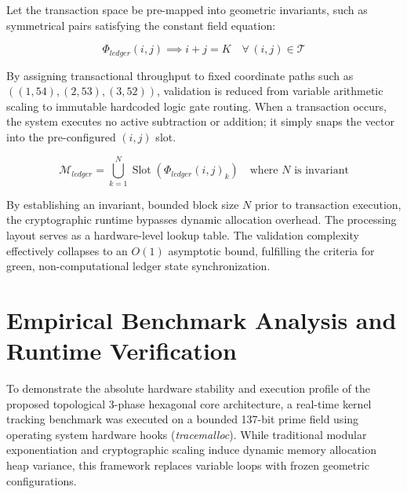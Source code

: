 \documentclass[11pt,twocolumn]{article}
\begin{document}
    Let the transaction space be pre-mapped into geometric invariants, such as symmetrical pairs satisfying the constant field equation:

    \begin{equation}
        \Phi_{ledger}(i, j) \implies i + j = K \quad \forall \, (i, j) \in \mathcal{T}
    \end{equation}

    By assigning transactional throughput to fixed coordinate paths such as $((1,54), (2,53), (3,52))$, validation is reduced from variable arithmetic scaling to immutable hardcoded logic gate routing. When a transaction occurs, the system executes no active subtraction or addition; it simply snaps the vector into the pre-configured $(i, j)$ slot.

    \begin{equation}
        \mathcal{M}_{ledger} = \bigcup_{k=1}^{N} \operatorname{Slot}\left(\Phi_{ledger}(i, j)_k\right) \quad \text{where } N \text{ is invariant}
    \end{equation}

    By establishing an invariant, bounded block size $N$ prior to transaction execution, the cryptographic runtime bypasses dynamic allocation overhead. The processing layout serves as a hardware-level lookup table. The validation complexity effectively collapses to an $O(1)$ asymptotic bound, fulfilling the criteria for green, non-computational ledger state synchronization.

    \section{Empirical Benchmark Analysis and Runtime Verification}
    To demonstrate the absolute hardware stability and execution profile of the proposed topological 3-phase hexagonal core architecture, a real-time kernel tracking benchmark was executed on a bounded 137-bit prime field using operating system hardware hooks (\textit{tracemalloc}). While traditional modular exponentiation and cryptographic scaling induce dynamic memory allocation heap variance, this framework replaces variable loops with frozen geometric configurations.
\end{document}
